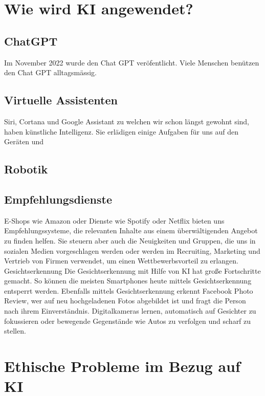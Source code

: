 \documentclass{report}
\begin{document}
   \chapter{Wie wird KI angewendet?}
   \section{ChatGPT} 
   Im November 2022 wurde den Chat GPT veröfentlicht. Viele Menschen benützen den Chat GPT alltagsmässig.     
   \section {Virtuelle Assistenten}
   Siri, Cortana und Google Assistant zu welchen wir schon längst gewohnt sind, haben künstliche Intelligenz. Sie erlädigen einige Aufgaben für uns auf den Geräten 
   und 
  \section{Robotik}
   \section{Empfehlungsdienste}
   E-Shops wie Amazon oder Dienste wie Spotify oder Netflix bieten uns Empfehlungssysteme, die relevanten Inhalte
    aus einem überwältigenden Angebot zu finden helfen. Sie steuern aber auch die Neuigkeiten und Gruppen,
 die uns in sozialen Medien vorgeschlagen werden oder werden im Recruiting, Marketing und Vertrieb von Firmen verwendet, 
 um einen Wettbewerbsvorteil zu erlangen.
 Gesichtserkennung
Die Gesichtserkennung mit Hilfe von KI hat große Fortschritte gemacht. 
So können die meisten Smartphones heute mittels Gesichtserkennung entsperrt werden. 
Ebenfalls mittels Gesichtserkennung erkennt Facebook Photo Review, wer auf neu hochgeladenen 
Fotos abgebildet ist und fragt die Person nach ihrem Einverständnis. Digitalkameras lernen, automatisch
 auf Gesichter zu fokussieren oder bewegende Gegenstände wie Autos zu verfolgen und scharf zu stellen.

 \chapter{Ethische Probleme im Bezug auf KI}
\end{document}
